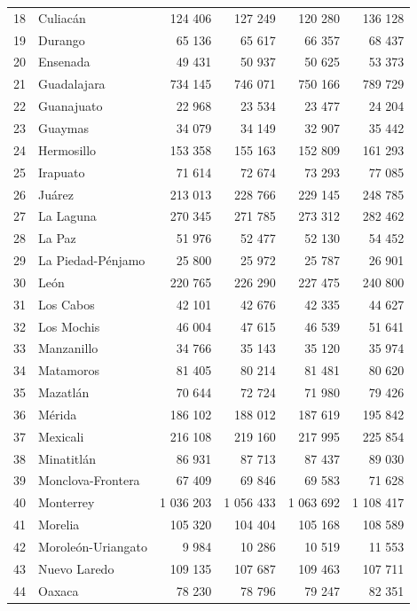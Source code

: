 \documentclass[]{article}
\begin{document}
\begin{table}[H]
\begin{tabular}{rlrrrr}
  18 & Culiacán & 124 406 & 127 249 & 120 280 & 136 128 \\ 
  19 & Durango & 65 136 & 65 617 & 66 357 & 68 437 \\ 
  20 & Ensenada & 49 431 & 50 937 & 50 625 & 53 373 \\ 
  21 & Guadalajara & 734 145 & 746 071 & 750 166 & 789 729 \\ 
  22 & Guanajuato & 22 968 & 23 534 & 23 477 & 24 204 \\ 
  23 & Guaymas & 34 079 & 34 149 & 32 907 & 35 442 \\ 
  24 & Hermosillo & 153 358 & 155 163 & 152 809 & 161 293 \\ 
  25 & Irapuato & 71 614 & 72 674 & 73 293 & 77 085 \\ 
  26 & Juárez & 213 013 & 228 766 & 229 145 & 248 785 \\ 
  27 & La Laguna & 270 345 & 271 785 & 273 312 & 282 462 \\ 
  28 & La Paz & 51 976 & 52 477 & 52 130 & 54 452 \\ 
  29 & La Piedad-Pénjamo & 25 800 & 25 972 & 25 787 & 26 901 \\ 
  30 & León & 220 765 & 226 290 & 227 475 & 240 800 \\ 
  31 & Los Cabos & 42 101 & 42 676 & 42 335 & 44 627 \\ 
  32 & Los Mochis & 46 004 & 47 615 & 46 539 & 51 641 \\ 
  33 & Manzanillo & 34 766 & 35 143 & 35 120 & 35 974 \\ 
  34 & Matamoros & 81 405 & 80 214 & 81 481 & 80 620 \\ 
  35 & Mazatlán & 70 644 & 72 724 & 71 980 & 79 426 \\ 
  36 & Mérida & 186 102 & 188 012 & 187 619 & 195 842 \\ 
  37 & Mexicali & 216 108 & 219 160 & 217 995 & 225 854 \\ 
  38 & Minatitlán & 86 931 & 87 713 & 87 437 & 89 030 \\ 
  39 & Monclova-Frontera & 67 409 & 69 846 & 69 583 & 71 628 \\ 
  40 & Monterrey & 1 036 203 & 1 056 433 & 1 063 692 & 1 108 417 \\ 
  41 & Morelia & 105 320 & 104 404 & 105 168 & 108 589 \\ 
  42 & Moroleón-Uriangato & 9 984 & 10 286 & 10 519 & 11 553 \\ 
  43 & Nuevo Laredo & 109 135 & 107 687 & 109 463 & 107 711 \\ 
  44 & Oaxaca & 78 230 & 78 796 & 79 247 & 82 351 \\ 

\end{tabular}
\end{table}
\end{document}
